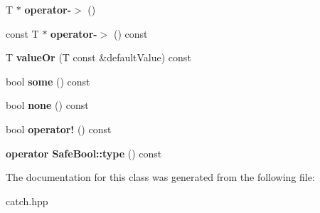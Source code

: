 \begin{DoxyCompactItemize}
\item 
T $\ast$ {\bfseries operator-\/$>$} ()\hypertarget{classCatch_1_1Option_acad340798a16c8f700f8763119e90f31}{}\label{classCatch_1_1Option_acad340798a16c8f700f8763119e90f31}

\item 
const T $\ast$ {\bfseries operator-\/$>$} () const \hypertarget{classCatch_1_1Option_a0800340b2971748671b88acfb14bb928}{}\label{classCatch_1_1Option_a0800340b2971748671b88acfb14bb928}

\item 
T {\bfseries value\+Or} (T const \&default\+Value) const \hypertarget{classCatch_1_1Option_a21b5629a7febbe3e23c475c9d9138a2d}{}\label{classCatch_1_1Option_a21b5629a7febbe3e23c475c9d9138a2d}

\item 
bool {\bfseries some} () const \hypertarget{classCatch_1_1Option_affa96f15798b4656fb753ff52d12dec2}{}\label{classCatch_1_1Option_affa96f15798b4656fb753ff52d12dec2}

\item 
bool {\bfseries none} () const \hypertarget{classCatch_1_1Option_a389324d2aa20ceb0eb0f48a5f77c20c8}{}\label{classCatch_1_1Option_a389324d2aa20ceb0eb0f48a5f77c20c8}

\item 
bool {\bfseries operator!} () const \hypertarget{classCatch_1_1Option_a47a1b6f6def2730ea9d27a1860a4f97f}{}\label{classCatch_1_1Option_a47a1b6f6def2730ea9d27a1860a4f97f}

\item 
{\bfseries operator Safe\+Bool\+::type} () const \hypertarget{classCatch_1_1Option_a637d4366ae7f0ded52ce59c8cb06da7b}{}\label{classCatch_1_1Option_a637d4366ae7f0ded52ce59c8cb06da7b}

\end{DoxyCompactItemize}


The documentation for this class was generated from the following file\+:\begin{DoxyCompactItemize}
\item 
catch.\+hpp\end{DoxyCompactItemize}
